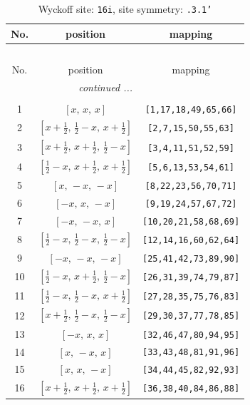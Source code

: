 \documentclass[fleqn,8pt]{jsarticle}
\begin{document}
\begin{longtable}{ccc}
\caption{Wyckoff site: {\tt 16i}, site symmetry: {\tt .3.1'}}
 \\
 \hline \hline
No. & position & mapping \\ \hline \endfirsthead

\multicolumn{2}{l}{\tablename\ \thetable{}} \\
 \hline \hline
No. & position & mapping \\ \hline \endhead

 \hline \hline
\multicolumn{2}{r}{\footnotesize\it continued ...} \\ \endfoot

 \hline \hline
\multicolumn{2}{r}{} \\ \endlastfoot

1 & $\left[ x,\, x,\, x \right]$ & {\tt [1,17,18,49,65,66]} \\ \hline
2 & $\left[ x + \frac{1}{2},\, \frac{1}{2} - x,\, x + \frac{1}{2} \right]$ & {\tt [2,7,15,50,55,63]} \\ \hline
3 & $\left[ x + \frac{1}{2},\, x + \frac{1}{2},\, \frac{1}{2} - x \right]$ & {\tt [3,4,11,51,52,59]} \\ \hline
4 & $\left[ \frac{1}{2} - x,\, x + \frac{1}{2},\, x + \frac{1}{2} \right]$ & {\tt [5,6,13,53,54,61]} \\ \hline
5 & $\left[ x,\, - x,\, - x \right]$ & {\tt [8,22,23,56,70,71]} \\ \hline
6 & $\left[ - x,\, x,\, - x \right]$ & {\tt [9,19,24,57,67,72]} \\ \hline
7 & $\left[ - x,\, - x,\, x \right]$ & {\tt [10,20,21,58,68,69]} \\ \hline
8 & $\left[ \frac{1}{2} - x,\, \frac{1}{2} - x,\, \frac{1}{2} - x \right]$ & {\tt [12,14,16,60,62,64]} \\ \hline
9 & $\left[ - x,\, - x,\, - x \right]$ & {\tt [25,41,42,73,89,90]} \\ \hline
10 & $\left[ \frac{1}{2} - x,\, x + \frac{1}{2},\, \frac{1}{2} - x \right]$ & {\tt [26,31,39,74,79,87]} \\ \hline
11 & $\left[ \frac{1}{2} - x,\, \frac{1}{2} - x,\, x + \frac{1}{2} \right]$ & {\tt [27,28,35,75,76,83]} \\ \hline
12 & $\left[ x + \frac{1}{2},\, \frac{1}{2} - x,\, \frac{1}{2} - x \right]$ & {\tt [29,30,37,77,78,85]} \\ \hline
13 & $\left[ - x,\, x,\, x \right]$ & {\tt [32,46,47,80,94,95]} \\ \hline
14 & $\left[ x,\, - x,\, x \right]$ & {\tt [33,43,48,81,91,96]} \\ \hline
15 & $\left[ x,\, x,\, - x \right]$ & {\tt [34,44,45,82,92,93]} \\ \hline
16 & $\left[ x + \frac{1}{2},\, x + \frac{1}{2},\, x + \frac{1}{2} \right]$ & {\tt [36,38,40,84,86,88]} \\
\end{longtable}
\end{document}
